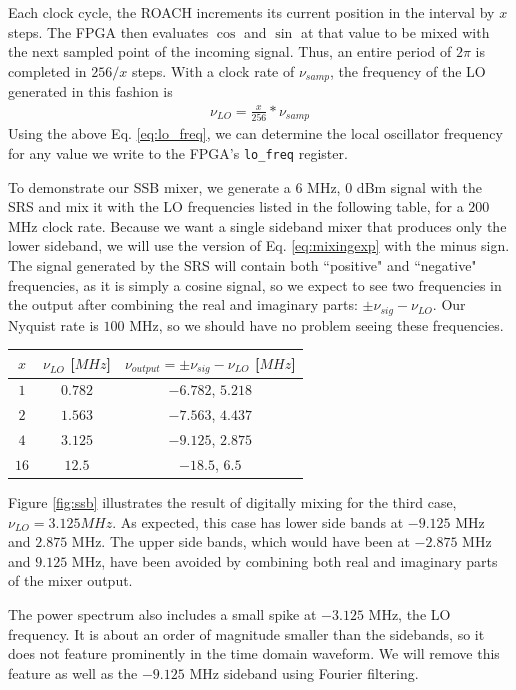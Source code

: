 \documentclass[12pt]{article}
\begin{document}
Each clock cycle, the ROACH increments its current position in the interval by $x$ steps. The FPGA then evaluates $\cos$ and $\sin$ at that value to be mixed with the next sampled point of the incoming signal. Thus, an entire period of $2\pi$ is completed in $256/x$ steps. With a clock rate of $\nu_{samp}$, the frequency of the LO generated in this fashion is
\begin{eqnarray}
\nu_{LO} = \frac{x}{256} * \nu_{samp} \label{eq:lo_freq}
\end{eqnarray}
Using the above Eq. \ref{eq:lo_freq}, we can determine the local oscillator frequency for any value we write to the FPGA's \texttt{lo\_freq} register.

To demonstrate our SSB mixer, we generate a $6$ MHz, $0$ dBm signal with the SRS and mix it with the LO frequencies listed in the following table, for a $200$ MHz clock rate. Because we want a single sideband mixer that produces only the lower sideband, we will use the version of Eq. \ref{eq:mixingexp} with the minus sign. The signal generated by the SRS will contain both ``positive" and ``negative" frequencies, as it is simply a cosine signal, so we expect to see two frequencies in the output after combining the real and imaginary parts: $\pm \nu_{sig} - \nu_{LO}$. Our Nyquist rate is $100$ MHz, so we should have no problem seeing these frequencies.
\begin{center}
  \begin{tabular}{ c | c | c }
    $x$ & $\nu_{LO}$ [$MHz$] & $\nu_{output} = \pm \nu_{sig} - \nu_{LO}$ [$MHz$]\\ \hline
    $1$ & $0.782 $ & $-6.782$, $5.218 $ \\
    $2$ & $1.563 $ & $-7.563$, $4.437$\\
    $4$ & $3.125 $ & $-9.125$, $2.875$ \\
    $16$ & $12.5 $ & $-18.5$, $6.5$\\
  \end{tabular}
\end{center}

Figure \ref{fig:ssb} illustrates the result of digitally mixing for the third case, $\nu_{LO} = 3.125 MHz$. As expected, this case has lower side bands at $-9.125$ MHz and $2.875$ MHz. The upper side bands, which would have been at $-2.875$ MHz and $9.125$ MHz, have been avoided by combining both real and imaginary parts of the mixer output.

The power spectrum also includes a small spike at $-3.125$ MHz, the LO frequency. It is about an order of magnitude smaller than the sidebands, so it does not feature prominently in the time domain waveform. We will remove this feature as well as the $-9.125$ MHz sideband using Fourier filtering.
\end{document}
